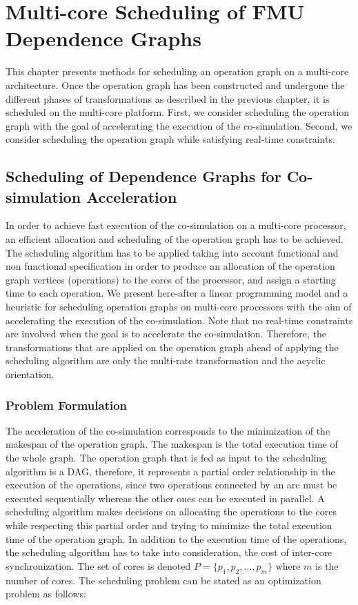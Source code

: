 \chapter{\label{ch:5-sched}Multi-core Scheduling of FMU Dependence Graphs} 

\minitoc

This chapter presents methods for scheduling an operation graph on a multi-core architecture. Once the operation graph has been constructed and undergone the different phases of transformations as described in the previous chapter, it is scheduled on the multi-core platform. First, we consider scheduling the operation graph with the goal of accelerating the execution of the co-simulation. Second, we consider scheduling the operation graph while satisfying real-time constraints.  

\section{Scheduling of Dependence Graphs for Co-simulation Acceleration}

In order to achieve fast execution of the co-simulation on a multi-core processor, an efficient allocation and scheduling of the operation graph has to be achieved. The scheduling algorithm has to be applied taking into account functional and non functional specification in order to produce an allocation of the operation graph vertices (operations) to the cores of the processor, and assign a starting time to each operation. We present here-after a linear programming model and a heuristic for scheduling operation graphs on multi-core processors with the aim of accelerating the execution of the co-simulation. Note that no real-time constraints are involved when the goal is to accelerate the co-simulation. Therefore, the transformations that are applied on the operation graph ahead of applying the scheduling algorithm are only the multi-rate transformation and the acyclic orientation. 

\subsection{\label{5:shed-prob}Problem Formulation}

The acceleration of the co-simulation corresponds to the minimization of the makespan of the operation graph. The makespan is the total execution time of the whole graph. The operation graph that is fed as input to the scheduling algorithm is a DAG, therefore, it represents a partial order relationship in the execution of the operations, since two operations connected by an arc must be executed sequentially whereas the other ones can be executed in parallel. A scheduling algorithm makes decisions on allocating the operations to the cores while respecting this partial order and trying to minimize the total execution time of the operation graph. In addition to the execution time of the operations, the scheduling algorithm has to take into consideration, the cost of inter-core synchronization. The set of cores is denoted $P = \{p_1, p_2, \ldots, p_m\}$ where $m$ is the number of cores. The scheduling problem can be stated as an optimization problem as follows:

